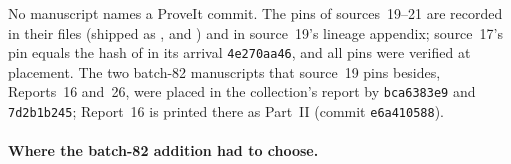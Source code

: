 \documentclass[11pt,letterpaper]{article}
\numberwithin{equation}{section}
\theoremstyle{definition}
\theoremstyle{remark}
\begin{document}
No manuscript names a ProveIt commit. The pins of sources~19--21 are recorded in their  files (shipped as ,  and ) and in source~19's lineage appendix; source~17's pin equals the hash of  in its arrival \texttt{4e270aa46}, and all pins were verified at placement. The two batch-82 manuscripts that source~19 pins besides, Reports~16 and~26, were placed in the collection's report  by \texttt{bca6383e9} and \texttt{7d2b1b245}; Report~16 is printed there as Part~II (commit \texttt{e6a410588}).

\paragraph{Where the batch-82 addition had to choose.}
\end{document}
